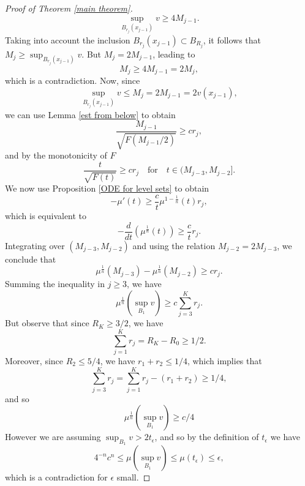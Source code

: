 \documentclass[12pt,a4paper]{amsart}
\numberwithin{equation}{section} %
\theoremstyle{definition}
\theoremstyle{remark}
\begin{document}
\begin{proof}[Proof of Theorem \ref{main theorem}]
$$
    \sup_{B_{r_j}\left(x_{j-1}\right)} v \geq 4M_{j-1}.
$$
Taking into account the inclusion $B_{r_j}\left(x_{j-1}\right) \subset B_{R_j}$, it follows that $M_j \geq \sup_{B_{r_j}\left(x_{j-1}\right)} v$. But $M_j = 2M_{j-1}$, leading to
$$
    M_j \geq 4M_{j-1} = 2M_j,
$$
which is a contradiction. Now, since
$$
    \sup_{B_{r_j}\left(x_{j-1}\right)} v \leq M_j = 2M_{j-1} = 2v\left(x_{j-1}\right),
$$
we can use Lemma \ref{est from below} to obtain
$$
    \frac{M_{j-1}}{\sqrt{F(M_{j-1}/2)}} \geq cr_{j},
$$
and by the monotonicity of $F$
$$
    \frac{t}{\sqrt{F(t)}} \geq cr_{j} \quad \text{for} \quad t \in (M_{j-3},M_{j-2}].
$$
We now use Proposition \ref{ODE for level sets} to obtain
$$
    -\mu'(t) \geq \frac{c}{t} \mu^{1 - \frac{1}{n}}(t)r_j, 
$$
which is equivalent to
$$
    -\frac{d}{dt}\left(\mu^{\frac{1}{n}}(t)\right) \geq \frac{c}{t}r_j.
$$
Integrating over $(M_{j-3},M_{j-2})$ and using the relation $M_{j-2} = 2M_{j-3}$, we conclude that
$$
    \mu^{\frac{1}{n}}(M_{j-3}) - \mu^{\frac{1}{n}}(M_{j-2}) \geq cr_j.
$$
Summing the inequality in $j \geq 3$, we have
$$
    \mu^{\frac{1}{n}}\left(\sup_{B_1} v\right) \geq c \sum_{j=3}^K r_j. 
$$
But observe that since $R_K \geq 3/2$, we have
$$
    \sum_{j=1}^K r_j = R_K - R_0 \geq 1/2.
$$
Moreover, since $R_2 \leq 5/4$, we have $r_1 + r_2 \leq 1/4$, which implies that
$$
    \sum_{j=3}^K r_j = \sum_{j=1}^K r_j - (r_1 + r_2) \geq 1/4,
$$
and so
$$
   \mu^{\frac{1}{n}}\left(\sup_{B_1} v\right) \geq c/4 
$$
However we are assuming $\sup_{B_1} v > 2t_{\epsilon}$, and so by the definition of $t_\epsilon$ we have
$$
    4^{-n}c^n \leq \mu\left(\sup_{B_1} v\right) \leq \mu(t_\epsilon) \leq \epsilon,
$$
which is a contradiction for $\epsilon$ small. 


\end{proof}
\end{document}
